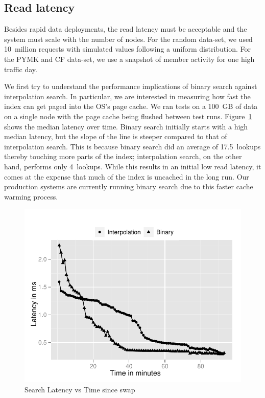 \subsection{Read latency}

Besides rapid data deployments, the read latency must be acceptable
and the system must scale with the number of nodes. For the random
data-set, we used 10~million requests with simulated values following
a uniform distribution. For the PYMK and CF data-set, we use a
snapshot of member activity for one high traffic day.

We first try to understand the performance implications of binary
search against interpolation search. In particular, we are interested
in measuring how fast the index can get paged into the OS's page
cache. We ran tests on a 100~GB of data on a single node with the page
cache being flushed between test runs. Figure~\ref{search} shows the
median latency over time. Binary search initially starts with a high
median latency, but the slope of the line is steeper compared to that
of interpolation search. This is because binary search did an average
of 17.5~lookups thereby touching more parts of the index;
interpolation search, on the other hand, performs only 4~lookups.
While this results in an initial low read latency, it comes at the
expense that much of the index is uncached in the long run. Our
production systems are currently running binary search due to this
faster cache warming process.  

\begin{figure}
  \centering
    \includegraphics[scale=0.55]{images/search_1node.pdf}
  \caption{Search Latency vs Time since swap}
  \label{search}
\end{figure}

